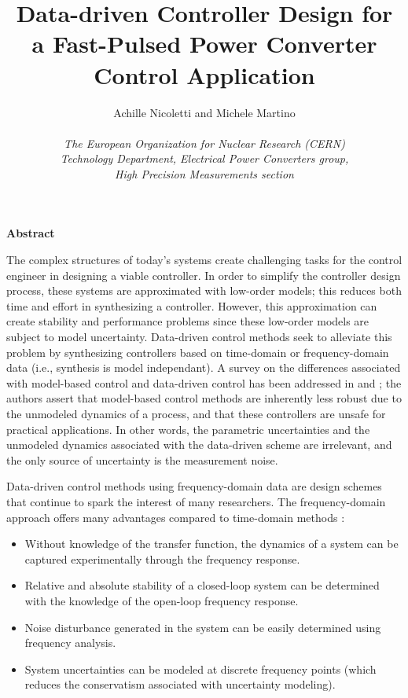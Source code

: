 \documentclass[11pt,english]{article}
\author{
  Achille Nicoletti and Michele Martino\\ \\
  \textit{\small The European Organization for Nuclear Research (CERN)} \\
  \textit{\small Technology Department, Electrical Power Converters group,} \\
  \textit{\small High Precision Measurements section}
}
\title{Data-driven Controller Design for a Fast-Pulsed Power Converter Control Application}
\date{}
\begin{document}
  \maketitle
  
  \begin{center}
  \LARGE{\bf{Abstract}}
  \end{center}
 
The complex structures of today's systems create challenging tasks for the control engineer in designing a viable controller. In order to simplify the controller design process, these systems are approximated with low-order models; this reduces both time and effort in synthesizing a controller. However, this approximation can create stability and performance problems since these low-order models are subject to model uncertainty. Data-driven control methods seek to alleviate this problem by synthesizing controllers based on time-domain or frequency-domain data (i.e., synthesis is model independant). A survey on the differences associated with model-based control and data-driven control has been addressed in \cite{HW13} and \cite{BCE12}; the authors assert that model-based control methods are inherently less robust due to the unmodeled dynamics of a process, and that these controllers are unsafe for practical applications. In other words, the parametric uncertainties and the unmodeled dynamics associated with the data-driven scheme are irrelevant, and the only source of uncertainty is the measurement noise.

Data-driven control methods using frequency-domain data are design schemes that continue to spark the interest of many researchers. The frequency-domain approach offers many advantages compared to time-domain methods :
\begin{itemize}
\item Without knowledge of the transfer function, the dynamics of a system can be captured experimentally through the frequency response.
\item Relative and absolute stability of a closed-loop system can be determined with the knowledge of the open-loop frequency response.
\item Noise disturbance generated in the system can be easily determined using frequency analysis.
\item System uncertainties can be modeled at discrete frequency points (which reduces the conservatism associated with uncertainty modeling). 
\end{itemize}
\end{document}
